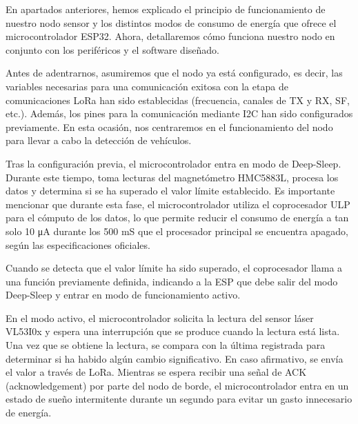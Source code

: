 En apartados anteriores, hemos explicado el principio de funcionamiento de nuestro nodo sensor y los distintos modos de consumo de energía que ofrece el microcontrolador ESP32. Ahora, detallaremos cómo funciona nuestro nodo en conjunto con los periféricos y el software diseñado.

Antes de adentrarnos, asumiremos que el nodo ya está configurado, es decir, las variables necesarias para una comunicación exitosa con la etapa de comunicaciones LoRa han sido establecidas (frecuencia, canales de TX y RX, SF, etc.). Además, los pines para la comunicación mediante I2C han sido configurados previamente. En esta ocasión, nos centraremos en el funcionamiento del nodo para llevar a cabo la detección de vehículos.


Tras la configuración previa, el microcontrolador entra en modo de Deep-Sleep. Durante este tiempo, toma lecturas del magnetómetro HMC5883L, procesa los datos y determina si se ha superado el valor límite establecido. Es importante mencionar que durante esta fase, el microcontrolador utiliza el coprocesador ULP para el cómputo de los datos, lo que permite reducir el consumo de energía a tan solo 10 μA durante los 500 mS que el procesador principal se encuentra apagado, según las especificaciones oficiales.


Cuando se detecta que el valor límite ha sido superado, el coprocesador llama a una función previamente definida, indicando a la ESP que debe salir del modo Deep-Sleep y entrar en modo de funcionamiento activo.

En el modo activo, el microcontrolador solicita la lectura del sensor láser VL53I0x y espera una interrupción que se produce cuando la lectura está lista. Una vez que se obtiene la lectura, se compara con la última registrada para determinar si ha habido algún cambio significativo. En caso afirmativo, se envía el valor a través de LoRa.
Mientras se espera recibir una señal de ACK (acknowledgement) por parte del nodo de borde, el microcontrolador entra en un estado de sueño intermitente durante un segundo para evitar un gasto innecesario de energía.

